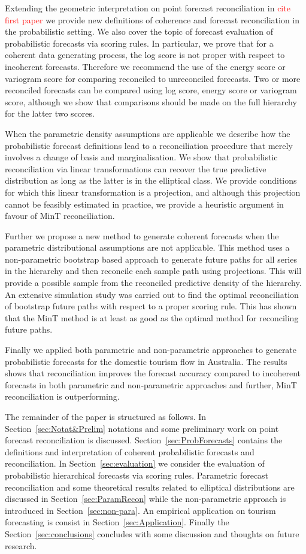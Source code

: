 \documentclass[12pt]{article}
\theoremstyle{definition}
\begin{document}
Extending the geometric interpretation on point forecast reconciliation in \textcolor{red}{cite first paper} we provide new definitions of coherence and forecast reconciliation in the probabilistic setting. We also cover the topic of forecast evaluation of probabilistic forecasts via scoring rules. In particular, we prove that for a coherent data generating process, the log score is not proper with respect to incoherent forecasts. Therefore we recommend the use of the energy score or variogram score for comparing reconciled to unreconciled forecasts. Two or more reconciled forecasts can be compared using log score, energy score or variogram score, although we show that comparisons should be made on the full hierarchy for the latter two scores.

When the parametric density assumptions are applicable we describe how the probabilistic forecast definitions lead to a reconciliation procedure that merely involves a change of basis and marginalisation. We show that probabilistic reconciliation via linear transformations can recover the true predictive distribution as long as the latter is in the elliptical class. We provide conditions for which this linear transformation is a projection, and although this projection cannot be feasibly estimated in practice, we provide a heuristic argument in favour of MinT reconciliation.

Further we propose a new method to generate coherent forecasts when the parametric distributional assumptions are not applicable. This method uses a non-parametric bootstrap based approach to generate future paths for all series in the hierarchy and then reconcile each sample path using projections. This will provide a possible sample from the reconciled predictive density of the hierarchy. An extensive simulation study was carried out to find the optimal reconciliation of bootstrap future paths with respect to a proper scoring rule. This has shown that the MinT method is at least as good as the optimal method for reconciling future paths. 

Finally we applied both parametric and non-parametric approaches to generate probabilistic forecasts for the domestic tourism flow in Australia. The results shows that reconciliation improves the forecast accuracy compared to incoherent forecasts in both parametric and non-parametric approaches and further, MinT reconciliation is outperforming.  

The remainder of the paper is structured as follows. In Section~\ref{sec:Notat&Prelim} notations and some preliminary work on point forecast reconciliation is discussed. Section~\ref{sec:ProbForecasts} contains the definitions and interpretation of coherent probabilistic forecasts and reconciliation. In Section~\ref{sec:evaluation} we consider the evaluation of probabilistic hierarchical forecasts via scoring rules. Parametric forecast reconciliation and some theoretical results related to elliptical distributions are discussed in Section~\ref{sec:ParamRecon} while the non-parametric approach is introduced in Section~\ref{sec:non-para}. An empirical application on tourism forecasting is consist in Section~\ref{sec:Application}. Finally the Section~\ref{sec:conclusions} concludes with some discussion and thoughts on future research.
\end{document}

